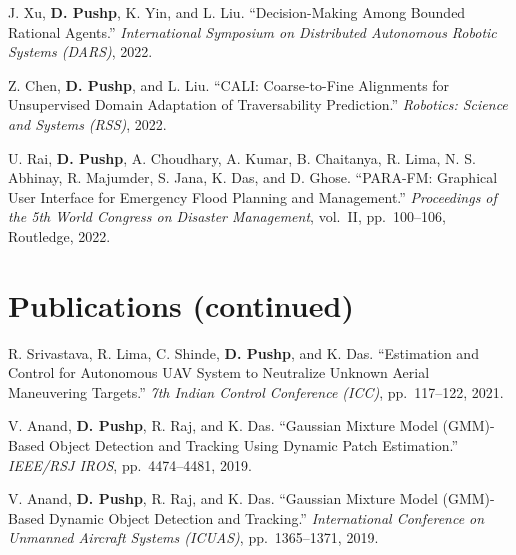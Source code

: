 \documentclass[11pt,letterpaper]{article}
\newcommand{\me}{\textbf{D. Pushp}}
\begin{document}
\begin{enumerate}[label={[C\arabic*]}]
    \item J. Xu, \me, K. Yin, and L. Liu.
    ``Decision-Making Among Bounded Rational Agents.''
    \emph{International Symposium on Distributed Autonomous
    Robotic Systems (DARS)}, 2022.

    \item Z. Chen, \me, and L. Liu.
    ``CALI: Coarse-to-Fine Alignments for Unsupervised
    Domain Adaptation of Traversability Prediction.''
    \emph{Robotics: Science and Systems (RSS)}, 2022.

    \item U. Rai, \me, A. Choudhary, A. Kumar, B. Chaitanya,
    R. Lima, N. S. Abhinay, R. Majumder, S. Jana, K. Das,
    and D. Ghose.
    ``PARA-FM: Graphical User Interface for Emergency
    Flood Planning and Management.''
    \emph{Proceedings of the 5th World Congress on Disaster
    Management}, vol.\ II, pp.\ 100--106, Routledge, 2022.

\end{enumerate}

\newpage


\section{Publications (continued)}

\begin{enumerate}[label={[C\arabic*]},start=13]

    \item R. Srivastava, R. Lima, C. Shinde, \me,
    and K. Das.
    ``Estimation and Control for Autonomous UAV System
    to Neutralize Unknown Aerial Maneuvering Targets.''
    \emph{7th Indian Control Conference (ICC)},
    pp.\ 117--122, 2021.

    \item V. Anand, \me, R. Raj, and K. Das.
    ``Gaussian Mixture Model (GMM)-Based Object Detection
    and Tracking Using Dynamic Patch Estimation.''
    \emph{IEEE/RSJ IROS}, pp.\ 4474--4481, 2019.

    \item V. Anand, \me, R. Raj, and K. Das.
    ``Gaussian Mixture Model (GMM)-Based Dynamic Object
    Detection and Tracking.''
    \emph{International Conference on Unmanned Aircraft
    Systems (ICUAS)}, pp.\ 1365--1371, 2019.

\end{enumerate}
\end{document}
